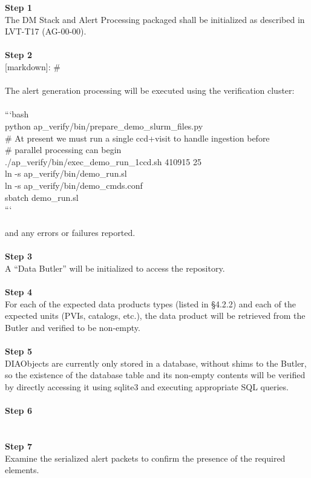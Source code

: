 \textbf{Step 1}\\
The DM Stack and Alert Processing packaged shall be initialized as
described in LVT-T17 (AG-00-00).\\
~\\
\textbf{Step 2}\\
{[}markdown{]}: \#\\
~\\
The alert generation processing will be executed using the verification
cluster:\\
~\\
```bash\\
python ap\_verify/bin/prepare\_demo\_slurm\_files.py\\
\# At present we must run a single ccd+visit to handle ingestion
before\\
\# parallel processing can begin\\
./ap\_verify/bin/exec\_demo\_run\_1ccd.sh 410915 25\\
ln -s ap\_verify/bin/demo\_run.sl\\
ln -s ap\_verify/bin/demo\_cmds.conf\\
sbatch demo\_run.sl\\
```\\
~\\
and any errors or failures reported.\\
~\\
\textbf{Step 3}\\
A ``Data Butler'' will be initialized to access the repository.\\
~\\
\textbf{Step 4}\\
For each of the expected data products types (listed in §4.2.2) and each
of the expected units (PVIs, catalogs, etc.), the data product will be
retrieved from the Butler and verified to be non-empty.\\
~\\
\textbf{Step 5}\\
DIAObjects are currently only stored in a database, without shims to the
Butler, so the existence of the database table and its non-empty
contents will be verified by directly accessing it using sqlite3 and
executing appropriate SQL queries.\\
~\\
\textbf{Step 6}\\
~\\
~\\
\textbf{Step 7}\\
Examine the serialized alert packets to confirm the presence of the
required elements.\\
\hspace*{0.333em} ~ ~ ~ ~ ~ ~ ~ ~ ~ ~ ~ ~ ~ ~ ~ ~ ~~ ~\\
~\\

